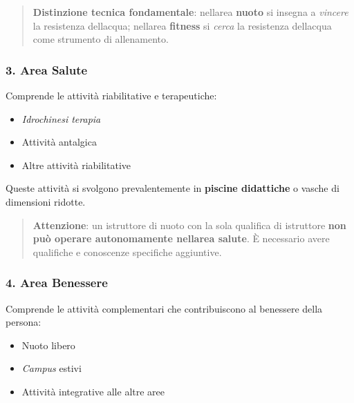 \documentclass[a4paper,11pt]{article}
\providecommand{\tightlist}{%
  \setlength{\itemsep}{0pt}\setlength{\parskip}{0pt}}
\begin{document}
\begin{quote}
      \textbf{Distinzione tecnica fondamentale}: nell\textquotesingle area
      \textbf{nuoto} si insegna a \emph{vincere} la resistenza
      dell\textquotesingle acqua; nell\textquotesingle area \textbf{fitness}
      si \emph{cerca} la resistenza dell\textquotesingle acqua come strumento
      di allenamento.
\end{quote}

\subsubsection{3. Area Salute}\label{area-salute}

Comprende le attività riabilitative e terapeutiche:

\begin{itemize}
      \tightlist
      \item
            \emph{Idrochinesi terapia}
      \item
            Attività antalgica
      \item
            Altre attività riabilitative
\end{itemize}

Queste attività si svolgono prevalentemente in \textbf{piscine
      didattiche} o vasche di dimensioni ridotte.

\begin{quote}
      \textbf{Attenzione}: un istruttore di nuoto con la sola qualifica di
      istruttore \textbf{non può operare autonomamente
            nell\textquotesingle area salute}. È necessario avere qualifiche e
      conoscenze specifiche aggiuntive.
\end{quote}

\subsubsection{4. Area Benessere}\label{area-benessere}

Comprende le attività complementari che contribuiscono al benessere
della persona:

\begin{itemize}
      \tightlist
      \item
            Nuoto libero
      \item
            \emph{Campus} estivi
      \item
            Attività integrative alle altre aree
\end{itemize}
\end{document}
